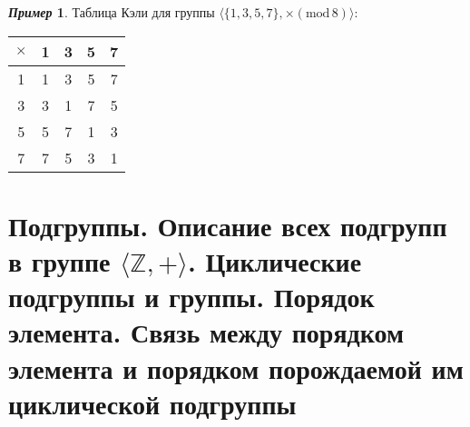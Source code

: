 \documentclass[a4paper, 14pt]{extarticle}
\newcommand{\n}{\par}
\newcommand{\integers}{\mathbb{Z}}
\renewcommand{\mod}{\mathrm{mod} \,}
\theoremstyle{definition}
\newtheorem*{exmpl*}{\textit{Пример}}
\theoremstyle{plain}
\numberwithin{theorem}{section}
\numberwithin{definition}{section}
\numberwithin{statement}{section}
\numberwithin{lemma}{section}
\numberwithin{consequence}{section}
\begin{document}
		\begin{exmpl*}
			Таблица Кэли для группы $\langle \{1, 3, 5, 7\}, \times (\mod 8) \rangle{:}$
			\begin{center}
				\begin{tabular}{c|cccc}
					$\times$ & 1 & 3 & 5 & 7\\
					\hline
					1 & 1 & 3 & 5 & 7\\
					
					3 & 3 & 1 & 7 & 5\\
					
					5 & 5 & 7 & 1 & 3\\
					
					7 & 7 & 5 & 3 & 1\\
				\end{tabular}
			\end{center} \n
		\end{exmpl*}
	\newpage
	\section{Подгруппы. Описание всех подгрупп в группе $\langle \integers, + \rangle$. Циклические подгруппы и группы. Порядок элемента. Связь между порядком элемента и порядком порождаемой им циклической подгруппы}
\end{document}
